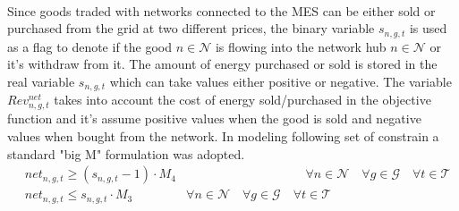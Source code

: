 \documentclass{article}
\newcommand{\cT}{{\mathcal T}}
\newcommand{\cES}{{\mathcal ES}}
\newcommand{\cN}{{\mathcal N}}
\newcommand{\cG}{{\mathcal G}}
\begin{document}
{\begin{align}
		\end{align}
\begin{comment}
		\begin{align}
		& l_{es,t}^{stor} - l_{es,t-1}^{stor} \cdot (1-\hat{\lambda}_{es}) = l_{es,t}^{charge} \cdot \hat{\eta}_{es}^{ch} - l_{es,t}^{disch} \cdot \frac{1}{\hat{\eta}_{es}^{disch}}  & \hspace{4cm} \forall es \in \cES \quad \forall t \in \cT \label{eq:Stor_level}\\
		& l_{es,t}^{stor} \leq x_{es}^{stor, D} &\hspace{1cm} \forall es \in \cES \quad \forall t \in \cT \label{eq:Stor_capacity}\\
		& l_{es,t}^{charge} \leq \hat{P}_{es}^{max, charge} \cdot \Delta t & \forall es \in \cES \quad \forall t \setminus\{1\} \in \cT \label{eq:Stor_maxCharge}\\
		& l_{es,t}^{disch} \leq \hat{P}_{es}^{max, disch} \cdot \Delta t & \forall es \in \cES \quad \forall t \setminus\{1\} \in \cT \label{eq:Stor_maxDisch}\\
		& l_{es,0}^{stor} = \hat{L}_{es}^{stor,0} \cdot x_{es}^{stor, D} &\forall es \in \cES \label{eq: Stor_init}\\
		& l_{es,0}^{stor} = l_{es, T}^{stor} &\forall es \in \cES \label{eq:Stor_boundaries}
		\end{align}
\end{comment}
Since goods traded with networks connected to the MES can be either sold or purchased from the grid at two different prices, the binary variable $s_{n,g,t}$ is used as a flag to denote if the good $n \in \cN$ is flowing into the network hub $n \in \cN$ or it's withdraw from it. The amount of energy purchased or sold is stored in the real variable $s_{n,g,t}$ which can take values either positive or negative. 
The variable $Rev_{n,g,t}^{net}$ takes into account the cost of energy sold/purchased in the objective function and it's assume positive values when the good is sold and negative values when bought from the network. In modeling following set of constrain a standard "big M" formulation was adopted.  
		\begin{align}
		& net_{n,g,t} \geq (s_{n,g,t} - 1) \cdot M_{4}& \hspace{4cm} \forall n \in \cN \quad \forall g \in \cG \quad \forall t \in \cT \label{eq:Net_1}\\
		& net_{n,g,t} \leq s_{n,g,t} \cdot M_{3} & \forall n \in \cN \quad \forall g \in \cG \quad \forall t \in \cT \label{eq:Net_2}\\

\end{align}}
\end{document}
